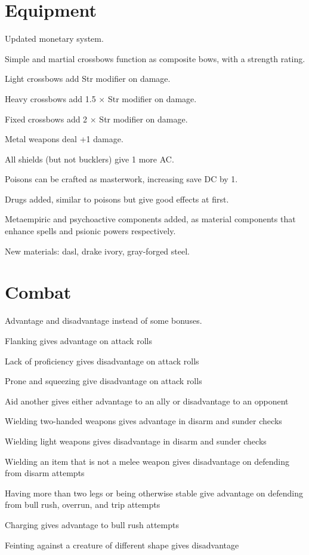 \section{Equipment}
\begin{itemize*}
	\item Updated monetary system.
	\item Simple and martial crossbows function as composite bows, with a strength rating.
	\begin{itemize*}
		\item Light crossbows add Str modifier on damage.
		\item Heavy crossbows add 1.5 $\times$ Str modifier on damage.
		\item Fixed crossbows add 2 $\times$ Str modifier on damage.
	\end{itemize*}
	\item Metal weapons deal +1 damage.
	\item All shields (but not bucklers) give 1 more AC.
	\item Poisons can be crafted as masterwork, increasing save DC by 1.
	\item Drugs added, similar to poisons but give good effects at first.
	\item Metaempiric and psychoactive components added, as material components that enhance spells and psionic powers respectively.
	\item New materials: dasl, drake ivory, gray-forged steel.
\end{itemize*}

\section{Combat}
\begin{itemize*}
	\item Advantage and disadvantage instead of some bonuses.
	\begin{itemize*}
		\item Flanking gives advantage on attack rolls
		\item Lack of proficiency gives disadvantage on attack rolls
		\item Prone and squeezing give disadvantage on attack rolls
		\item Aid another gives either advantage to an ally or disadvantage to an opponent
		\item Wielding two-handed weapons gives advantage in disarm and sunder checks
		\item Wielding light weapons gives disadvantage in disarm and sunder checks
		\item Wielding an item that is not a melee weapon gives disadvantage on defending from disarm attempts
		\item Having more than two legs or being otherwise stable give advantage on defending from bull rush, overrun, and trip attempts
		\item Charging gives advantage to bull rush attempts
		\item Feinting against a creature of different shape gives disadvantage
	\end{itemize*}
\end{itemize*}

